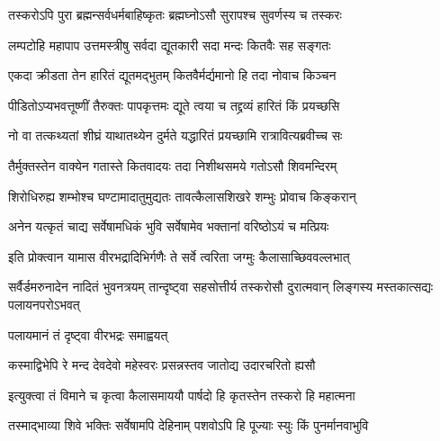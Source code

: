 
\vakta{}
\shrota{}
\tags{}
\notes{}

\storymeta





\twolineshloka
{तस्करोऽपि पुरा ब्रह्मन्सर्वधर्मबाहिष्कृतः}
{ब्रह्मघ्नोऽसौ सुरापश्च सुवर्णस्य च तस्करः}%

\twolineshloka
{लम्पटोहि महापाप उत्तमस्त्रीषु सर्वदा}
{द्यूतकारी सदा मन्दः कितवैः सह सङ्गतः}%

\twolineshloka
{एकदा क्रीडता तेन हारितं द्यूतमद्भुतम्}
{कितवैर्मर्द्यमानो हि तदा नोवाच किञ्चन}%

\twolineshloka
{पीडितोऽप्यभवत्तूष्णीं तैरुक्तः पापकृत्तमः}
{द्यूते त्वया च तद्द्रव्यं हारितं किं प्रयच्छसि}%

\twolineshloka
{नो वा तत्कथ्यतां शीघ्रं याथातथ्येन दुर्मते}
{यद्धारितं प्रयच्छामि रात्रावित्यब्रवीच्च सः}%

\twolineshloka
{तैर्मुक्तस्तेन वाक्येन गतास्ते कितवादयः}
{तदा निशीथसमये गतोऽसौ शिवमन्दिरम्}%

\twolineshloka
{शिरोधिरुह्य शम्भोश्च घण्टामादातुमुद्यतः}
{तावत्कैलासशिखरे शम्भुः प्रोवाच किङ्करान्}%

\twolineshloka
{अनेन यत्कृतं चाद्य सर्वेषामधिकं भुवि}
{सर्वेषामेव भक्तानां वरिष्ठोऽयं च मत्प्रियः}%

\twolineshloka
{इति प्रोक्त्वान यामास वीरभद्रादिभिर्गणैः}
{ते सर्वे त्वरिता जग्मुः कैलासाच्छिववल्लभात्}%

\threelineshloka
{सर्वैर्डमरुनादेन नादितं भुवनत्रयम्}
{तान्दृष्ट्वा सहसोत्तीर्य तस्करोसौ दुरात्मवान्}
{लिङ्गस्य मस्तकात्सद्यः पलायनपरोऽभवत्}%

\onelineshloka
{पलायमानं तं दृष्ट्वा वीरभद्रः समाह्वयत्}%

\twolineshloka
{कस्माद्विभेपि रे मन्द देवदेवो महेस्वरः}
{प्रसन्नस्तव जातोद्य उदारचरितो ह्यसौ}%

\twolineshloka
{इत्युक्त्वा तं विमाने च कृत्वा कैलासमाययौ}
{पार्षदो हि कृतस्तेन तस्करो हि महात्मना}%

\twolineshloka
{तस्माद्भाव्या शिवे भक्तिः सर्वेषामपि देहिनाम्}
{पशवोऽपि हि पूज्याः स्युः किं पुनर्मानवाभुवि}%

